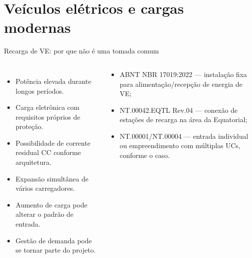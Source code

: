 \section{Veículos elétricos e cargas modernas}

\begin{frame}{Recarga de VE: por que não é uma tomada comum}
\small
\begin{columns}[T,onlytextwidth]
\begin{itemize}
\item Potência elevada durante longos períodos.
\item Carga eletrônica com requisitos próprios de proteção.
\item Possibilidade de corrente residual CC conforme arquitetura.
\item Expansão simultânea de vários carregadores.
\item Aumento de carga pode alterar o padrão de entrada.
\item Gestão de demanda pode se tornar parte do projeto.
\end{itemize}
\begin{caixaNorma}[title=Referências]
\begin{itemize}
\item ABNT NBR 17019:2022 — instalação fixa para alimentação/recepção de energia de VE;
\item NT.00042.EQTL Rev.04 — conexão de estações de recarga na área da Equatorial;
\item NT.00001/NT.00004 — entrada individual ou empreendimento com múltiplas UCs, conforme o caso.
\end{itemize}
\end{caixaNorma}
\end{columns}
\end{frame}

